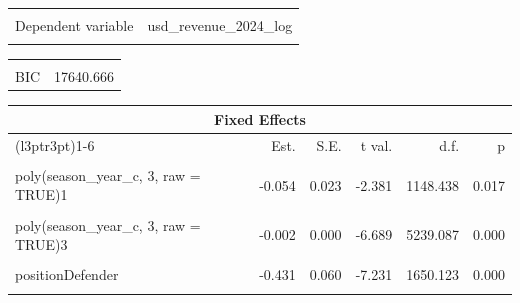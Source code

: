 \documentclass[
  12pt]{article}
\begin{document}
\begin{table}[!h]
\centering
\begin{tabular}{lr}
\toprule
\cellcolor{gray!10}{Observations} & \cellcolor{gray!10}{7023}\\
Dependent variable & usd\_revenue\_2024\_log\\
\cellcolor{gray!10}{Type} & \cellcolor{gray!10}{Mixed effects linear regression}\\
\bottomrule
\end{tabular}
\end{table} \begin{table}[!h]
\centering
\begin{tabular}{lr}
\toprule
\cellcolor{gray!10}{AIC} & \cellcolor{gray!10}{17469.242}\\
BIC & 17640.666\\
\bottomrule
\end{tabular}
\end{table} \begin{table}[!h]
\centering
\begin{threeparttable}
\begin{tabular}{lrrrrr}
\toprule
\multicolumn{6}{c}{Fixed Effects} \\
\cmidrule(l{3pt}r{3pt}){1-6}
  & Est. & S.E. & t val. & d.f. & p\\
\midrule
\cellcolor{gray!10}{(Intercept)} & \cellcolor{gray!10}{16.512} & \cellcolor{gray!10}{0.102} & \cellcolor{gray!10}{161.900} & \cellcolor{gray!10}{44.473} & \cellcolor{gray!10}{0.000}\\
poly(season\_year\_c, 3, raw = TRUE)1 & -0.054 & 0.023 & -2.381 & 1148.438 & 0.017\\
\cellcolor{gray!10}{poly(season\_year\_c, 3, raw = TRUE)2} & \cellcolor{gray!10}{0.022} & \cellcolor{gray!10}{0.005} & \cellcolor{gray!10}{4.848} & \cellcolor{gray!10}{5237.468} & \cellcolor{gray!10}{0.000}\\
poly(season\_year\_c, 3, raw = TRUE)3 & -0.002 & 0.000 & -6.689 & 5239.087 & 0.000\\
\cellcolor{gray!10}{height\_c} & \cellcolor{gray!10}{0.014} & \cellcolor{gray!10}{0.004} & \cellcolor{gray!10}{3.722} & \cellcolor{gray!10}{1669.492} & \cellcolor{gray!10}{0.000}\\
\addlinespace
positionDefender & -0.431 & 0.060 & -7.231 & 1650.123 & 0.000\\
\cellcolor{gray!10}{positionGoalkeeper} & \cellcolor{gray!10}{-1.240} & \cellcolor{gray!10}{0.098} & \cellcolor{gray!10}{-12.704} & \cellcolor{gray!10}{1666.856} & \cellcolor{gray!10}{0.000}\\

\end{tabular}
\end{threeparttable}
\end{table}
\end{document}
